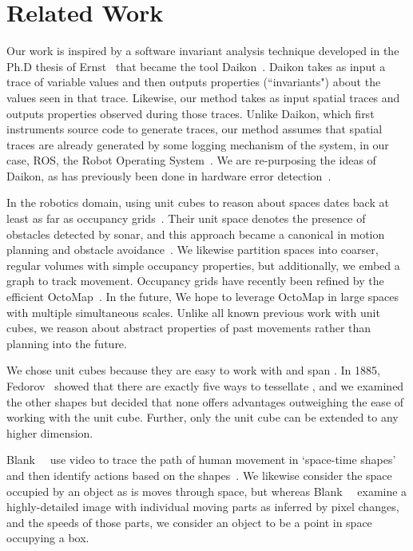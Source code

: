 \newpage
\section{Related Work}
\label{sec:related}

Our work is inspired by a software invariant analysis technique developed in the Ph.D thesis of Ernst~\cite{ernst2000dynamically} that became the tool Daikon~\cite{ernst2007daikon}.
Daikon takes as input a trace of variable values and then outputs properties (``invariants") about the values seen in that trace.
Likewise, our method takes as input spatial traces and outputs properties observed during those traces.
Unlike Daikon, which first instruments source code to generate traces, our method assumes that spatial traces are already generated by some logging mechanism of the system, in our case, ROS, the Robot Operating System~\cite{quigley2009ros}.
We are re-purposing the ideas of Daikon, as has previously been done in hardware error detection~\cite{sahoo2008using}.

In the robotics domain, using unit cubes to reason about spaces dates back at least as far as occupancy grids~\cite{moravec1985high}.
Their unit space denotes the presence of obstacles detected by sonar, and this approach became a canonical in motion planning and obstacle avoidance~\cite{elfes1989using,borenstein1989real,siegwart2011introduction}.
We likewise partition spaces into coarser, regular volumes with simple occupancy properties, but additionally, we embed a graph to track movement.
Occupancy grids have recently been refined by the efficient OctoMap~\cite{wurm2010octomap}.
In the future, We hope to leverage OctoMap in large spaces with multiple simultaneous scales.
Unlike all known previous work with unit cubes, we reason about abstract properties of past movements rather than planning into the future.

We chose unit cubes because they are easy to work with and span \rthree. 
In 1885, Fedorov~\cite{fedorov1885elements} showed that there are exactly five ways to tessellate \rthree, and we examined the other shapes but decided that none offers advantages outweighing the ease of working with the unit cube.
Further, only the unit cube can be extended to any higher dimension.

Blank~\etal~ use video to trace the path of human movement in `space-time shapes' and then identify actions based on the shapes~\cite{blank2005actions}.
We likewise consider the space occupied by an object as is moves through space, but whereas Blank~\etal~ examine a highly-detailed image with individual moving parts as inferred by pixel changes, and the speeds of those parts, we consider an object to be a point in space occupying a box.

